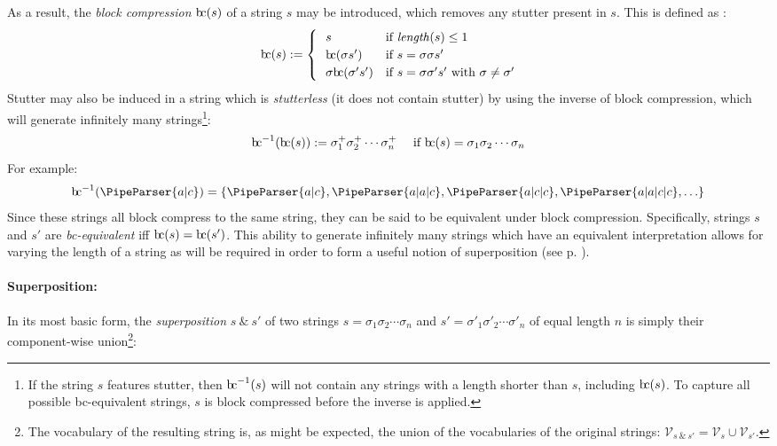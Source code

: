 \documentclass[a4paper,12pt,leqno]{article}
\newcommand{\bc}{{\rm b\!c}}
\newcommand{\vph}[1]{\vphantom{#1}}
\newcommand{\ebox}[1]{\fbox{$\vph{'(),}#1$}}
\renewcommand{\sp}{~\&~}
\newcommand{\EventString}[1]{%
	\renewcommand*{\do}[1]{\ebox{##1}}%
	\PipeParser{#1}%
}
\begin{document}
As a result, the \textit{block compression} $\bc(s)$ of a string $s$ may be introduced, which removes any stutter present in $s$. This is defined as \citep{fernando2015semantics, woods2017towards}:
\begin{align}\label{def:bc}
\bc(s) := 
\begin{cases}
	~~s & \text{if \textit{length}}(s) \leq 1\\
	~~\bc(\sigma s') & \text{if } s = \sigma \sigma s'\\
	~~\sigma \bc(\sigma' s') & \text{if } s = \sigma \sigma' s' \text{ with } \sigma \neq \sigma'
\end{cases}
\end{align}
Stutter may also be induced in a string which is \textit{stutterless} (it does not contain stutter) by using the inverse of block compression, which will generate infinitely many strings\footnote{If the string $s$ features stutter, then $\bc^{-1}(s)$ will not contain any strings with a length shorter than $s$, including $\bc(s)$. To capture all possible \bc-equivalent strings, $s$ is block compressed before the inverse is applied.}:
\begin{align}\label{def:inverse-bc}
\bc^{-1}(\bc(s)) := \sigma_1^+ \sigma_2^+ \cdots \sigma_n^+ ~~~ \mbox{ if } \bc(s) = \sigma_1 \sigma_2 \cdots \sigma_n
\end{align}
For example:
\begin{align}\label{ex:inverse-bc}
	\bc^{-1}(\EventString{a|c}) = \{\EventString{a|c}, \EventString{a|a|c}, \EventString{a|c|c}, \EventString{a|a|c|c}, \ldots\}
\end{align}
Since these strings all block compress to the same string, they can be said to be equivalent under block compression. Specifically, strings $s$ and $s'$ are \textit{\bc -equivalent} iff $\bc(s) = \bc(s')$. This ability to generate infinitely many strings which have an equivalent interpretation allows for varying the length of a string as will be required in order to form a useful notion of superposition (see p. \pageref{def:initial-async-superposition}).

\paragraph{Superposition:}\label{para:str-op-sp}
In its most basic form, the \textit{superposition} $s \sp s'$ of two strings $s = \sigma_1\sigma_2\cdots\sigma_n$ and $s' = \sigma'_1\sigma'_2\cdots\sigma'_n$ of equal length $n$ is simply their component-wise union\footnote{The vocabulary of the resulting string is, as might be expected, the union of the vocabularies of the original strings: $\mathcal{V}_{s \sp s'} = \mathcal{V}_s \cup \mathcal{V}_{s'}$.}:
\end{document}
